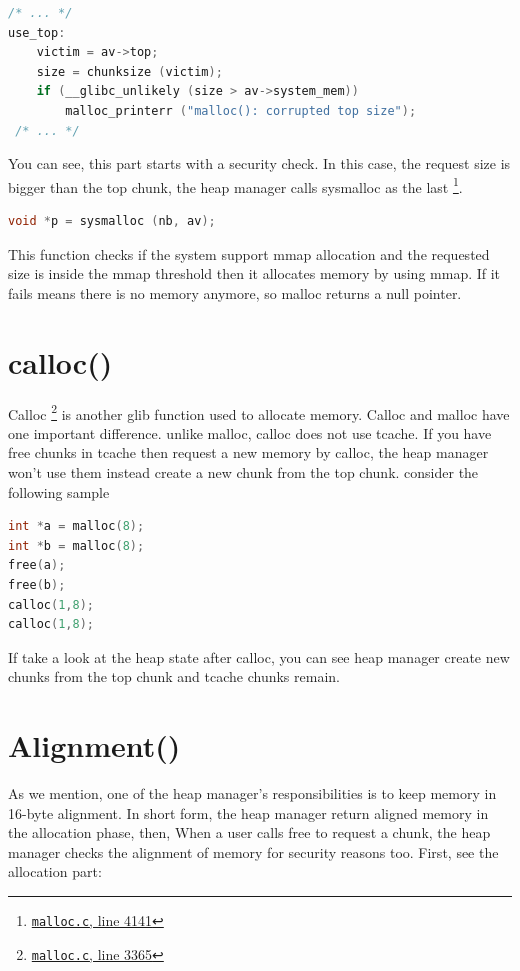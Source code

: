 \documentclass{masterthesis}
\newcommand*\tch{tcache}
\begin{document}
\begin{lstlisting}[language=c,frame=tlrb]
 /* ... */ 
use_top:
	victim = av->top;
	size = chunksize (victim);
	if (__glibc_unlikely (size > av->system_mem))
		malloc_printerr ("malloc(): corrupted top size");
 /* ... */ 
\end{lstlisting}

You can see, this part starts with a security check. In this case, the request size is bigger than the top chunk, the heap manager calls sysmalloc as the last \footnote{\href{https://sourceware.org/git/?p=glibc.git;a=blob;f=malloc/malloc.c;h=f7cd29bc2f93e1082ee77800bd64a4b2a2897055;hb=9ea3686266dca3f004ba874745a4087a89682617\#l4141}{\texttt{malloc.c}, line 4141}}.

\begin{lstlisting}[language=c,frame=tlrb]
 void *p = sysmalloc (nb, av);
 \end{lstlisting}

This function checks if the system support mmap allocation and the requested size is inside the mmap threshold then it allocates memory by using mmap. If it fails means there is no memory anymore, so malloc returns a null pointer.

\section{calloc()}
Calloc \footnote{\href{https://sourceware.org/git/?p=glibc.git;a=blob;f=malloc/malloc.c;h=f7cd29bc2f93e1082ee77800bd64a4b2a2897055;hb=9ea3686266dca3f004ba874745a4087a89682617\#l3365}{\texttt{malloc.c}, line 3365}} is another glib function used to allocate memory. Calloc and malloc have one important difference. unlike malloc, calloc does not use \tch{}. If you have free chunks in \tch{} then request a new memory by calloc, the heap manager won't use them instead create a new chunk from the top chunk. consider the following sample 

\begin{lstlisting}[language=c,frame=tlrb]
int *a = malloc(8);
int *b = malloc(8);
free(a);
free(b);
calloc(1,8);
calloc(1,8);
\end{lstlisting}

If take a look at the heap state after calloc, you can see heap manager create new chunks from the top chunk and \tch{} chunks remain.

\section{Alignment()}
As we mention, one of the heap manager's responsibilities is to keep memory in 16-byte alignment. In short form, the heap manager return aligned memory in the allocation phase, then, When a user calls free to request a chunk, the heap manager checks the alignment of memory for security reasons too. First, see the allocation part:
\end{document}
